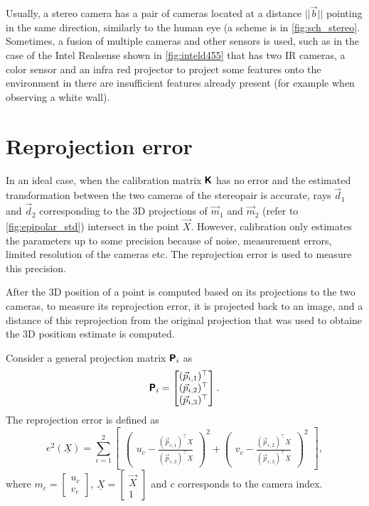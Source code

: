 Usually, a stereo camera has a pair of cameras located at a distance $||\vec{b}||$ pointing in the same direction, similarly to the human eye (a scheme is in \autoref{fig:sch_stereo}.
Sometimes, a fusion of multiple cameras and other sensors is used, such as in the case of the Intel Realsense shown in \autoref{fig:inteld455} that has two IR cameras, a color sensor and an infra red projector to project some features onto the environment in there are insufficient features already present (for example when observing a white wall).

\section{Reprojection error}
\label{sec:error_reprojection}
In an ideal case, when the calibration matrix $\pmb{\mathsf{K}}$ has no error and the estimated transformation between the two cameras of the stereopair is accurate, rays $\vec{d}_1$ and $\vec{d}_2$ corresponding to the 3D projections of $\vec{m}_1$ and $\vec{m}_2$ (refer to \autoref{fig:epipolar_std}) intersect in the point $\vec{X}$. 
However, calibration only estimates the parameters up to some precision because of noise, measurement errors, limited resolution of the cameras etc.
The reprojection error is used to measure this precision.

After the 3D position of a point is computed based on its projections to the two cameras, to measure its reprojection error, it is projected back to an image, and a distance of this reprojection from the original projection that was used to obtaine the 3D positiom estimate is computed.

Consider a general projection matrix $\pmb{\mathsf{P}}_i$ as
\begin{equation}
    \label{eq:p_general}
    \pmb{\mathsf{P}}_i = \begin{bmatrix} 
        (\vec{p}_{i, 1})^\top \\ 
        (\vec{p}_{i, 2})^\top \\ 
        (\vec{p}_{i, 3})^\top \end{bmatrix}.
\end{equation}
The reprojection error is defined as 
\begin{equation}
    e^2(\underline{X}) = \sum_{c=1}^{2}{  
    \begin{bmatrix}
        \begin{pmatrix}
            u_c - \frac{(\vec{p}_{c, 1})^\top \underline{X}}{(\vec{p}_{c, 3})^\top \underline{X}}
        \end{pmatrix}^2 + 
        \begin{pmatrix}
            v_c - \frac{(\vec{p}_{c, 2})^\top \underline{X}}{(\vec{p}_{c, 3})^\top \underline{X}}
        \end{pmatrix}^2
    \end{bmatrix}
    },
\end{equation}
where $m_c = \begin{bmatrix} u_c \\ v_c \end{bmatrix}$, $\underline{X} = \begin{bmatrix} \vec{X} \\ 1 \end{bmatrix}$ and $c$ corresponds to the camera index.
